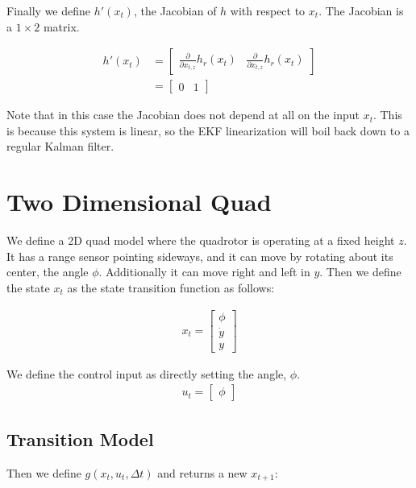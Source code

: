 \documentclass{article}
\begin{document}
Finally we define $h'(x_t)$, the Jacobian of $h$ with respect to
$x_t$.  The Jacobian is a $1\times2$ matrix.

\begin{align}
  h'(x_t) &= \left[\begin{array}{cccc}
      \frac{\partial}{\partial x_{t,\dot{z}}} h_r(x_t)&
      \frac{\partial}{\partial x_{t,z}} h_r(x_t)
    \end{array}   \right]\\
 &= \left[\begin{array}{cccc}
       0&
       1
    \end{array}   \right]  
\end{align}

Note that in this case the Jacobian does not depend at all on the
input $x_t$.  This is because this system is linear, so the EKF
linearization will boil back down to a regular Kalman filter.

\section{Two Dimensional Quad}
\label{sec:2d}
We define a 2D quad model where the quadrotor is operating at a fixed
height $z$.  It has a range sensor pointing sideways, and it can move
by rotating about its center, the angle $\phi$.  Additionally it can
move right and left in $y$.  Then we define the state $x_t$ as the
state transition function as follows:

\begin{align}
  x_t = \left[\begin{array}{c} \phi\\ \dot{y}\\ y\end{array}\right]
\end{align}

We define the control input as directly setting the angle, $\phi$. 
\begin{align}
  u_t = \left[\begin{array}{c} \phi \end{array}\right]
\end{align}

\subsection{Transition Model}

Then we define $g(x_t, u_t, \Delta t)$ and returns a new $x_{t+1}$:
\end{document}
